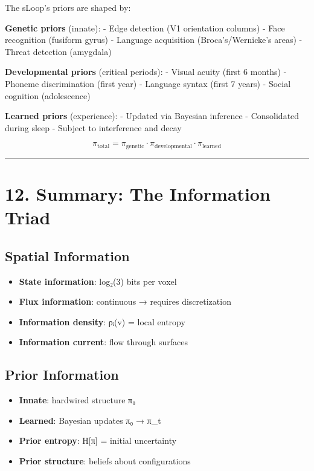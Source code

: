 \documentclass[
  11pt,
  letterpaper,
  twoside,
  openright]{book}
\providecommand{\tightlist}{%
  \setlength{\itemsep}{0pt}\setlength{\parskip}{0pt}}
\begin{document}
The sLoop's priors are shaped by:

\textbf{Genetic priors} (innate): - Edge detection (V1 orientation
columns) - Face recognition (fusiform gyrus) - Language acquisition
(Broca's/Wernicke's areas) - Threat detection (amygdala)

\textbf{Developmental priors} (critical periods): - Visual acuity (first
6 months) - Phoneme discrimination (first year) - Language syntax (first
7 years) - Social cognition (adolescence)

\textbf{Learned priors} (experience): - Updated via Bayesian inference -
Consolidated during sleep - Subject to interference and decay

\[\pi_{\text{total}} = \pi_{\text{genetic}} \cdot \pi_{\text{developmental}} \cdot \pi_{\text{learned}}\]

\begin{center}\rule{0.5\linewidth}{0.5pt}\end{center}

\section{12. Summary: The Information
Triad}\label{summary-the-information-triad}

\subsection{Spatial Information}\label{spatial-information}

\begin{itemize}
\tightlist
\item
  \textbf{State information}: log₂(3) bits per voxel
\item
  \textbf{Flux information}: continuous → requires discretization
\item
  \textbf{Information density}: ρᵢ(v) = local entropy
\item
  \textbf{Information current}: flow through surfaces
\end{itemize}

\subsection{Prior Information}\label{prior-information}

\begin{itemize}
\tightlist
\item
  \textbf{Innate}: hardwired structure π₀
\item
  \textbf{Learned}: Bayesian updates π₀ → π\_t
\item
  \textbf{Prior entropy}: H{[}π{]} = initial uncertainty
\item
  \textbf{Prior structure}: beliefs about configurations
\end{itemize}
\end{document}
